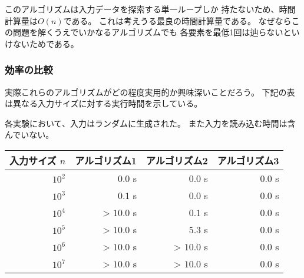 このアルゴリズムは入力データを探索する単一ループしか
持たないため、時間計算量は$O(n)$である。
これは考えうる最良の時間計算量である。
なぜならこの問題を解くうえでいかなるアルゴリズムでも
各要素を最低1回は辿らないといけないためである。

\begin{comment}
\subsubsection{Efficiency comparison}

It is interesting to study how efficient 
algorithms are in practice.
The following table shows the running times
of the above algorithms for different
values of $n$ on a modern computer.

In each test, the input was generated randomly.
The time needed for reading the input was not
measured.

\begin{center}
\begin{tabular}{rrrr}
array size $n$ & Algorithm 1 & Algorithm 2 & Algorithm 3 \\
\hline
$10^2$ & $0.0$ s & $0.0$ s & $0.0$ s \\
$10^3$ & $0.1$ s & $0.0$ s & $0.0$ s \\
$10^4$ & > $10.0$ s & $0.1$ s & $0.0$ s \\
$10^5$ & > $10.0$ s & $5.3$ s & $0.0$ s \\
$10^6$ & > $10.0$ s & > $10.0$ s & $0.0$ s \\
$10^7$ & > $10.0$ s & > $10.0$ s & $0.0$ s \\
\end{tabular}
\end{center}
\end{comment}

\subsubsection{効率の比較}

実際これらのアルゴリズムがどの程度実用的か興味深いことだろう。
下記の表は異なる入力サイズに対する実行時間を示している。

各実験において、入力はランダムに生成された。
また入力を読み込む時間は含んでいない。

\begin{center}
\begin{tabular}{rrrr}
入力サイズ $n$ & アルゴリズム1 & アルゴリズム2 & アルゴリズム3 \\
\hline
$10^2$ & $0.0$ s & $0.0$ s & $0.0$ s \\
$10^3$ & $0.1$ s & $0.0$ s & $0.0$ s \\
$10^4$ & > $10.0$ s & $0.1$ s & $0.0$ s \\
$10^5$ & > $10.0$ s & $5.3$ s & $0.0$ s \\
$10^6$ & > $10.0$ s & > $10.0$ s & $0.0$ s \\
$10^7$ & > $10.0$ s & > $10.0$ s & $0.0$ s \\
\end{tabular}
\end{center}

